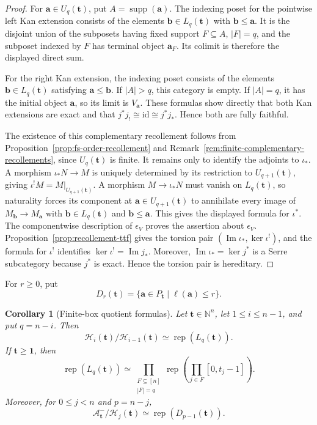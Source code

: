 \documentclass[12pt,reqno]{amsart}
\newtheorem{corollary}[theorem]{Corollary}
\theoremstyle{definition}
\theoremstyle{remark}
\newcommand{\Rep}{\operatorname{rep}}
\begin{document}
\begin{proof}
For $\mathbf a\in U_q(\mathbf t)$, put $A=\operatorname{supp}(\mathbf a)$.  The indexing poset for the pointwise left Kan extension consists of the elements $\mathbf b\in L_q(\mathbf t)$ with $\mathbf b\le\mathbf a$.  It is the disjoint union of the subposets having fixed support $F\subseteq A$, $|F|=q$, and the subposet indexed by $F$ has terminal object $\mathbf a_F$.  Its colimit is therefore the displayed direct sum.

For the right Kan extension, the indexing poset consists of the elements $\mathbf b\in L_q(\mathbf t)$ satisfying $\mathbf a\le\mathbf b$.  If $|A|>q$, this category is empty.  If $|A|=q$, it has the initial object $\mathbf a$, so its limit is $V_{\mathbf a}$.  These formulas show directly that both Kan extensions are exact and that $j^*j_!\cong\mathrm{id}\cong j^*j_*$.  Hence both are fully faithful.

The existence of this complementary recollement follows from
Proposition~\ref{prop:fs-order-recollement} and
Remark~\ref{rem:finite-complementary-recollements}, since
$U_q(\mathbf t)$ is finite.  It remains only to identify the adjoints to
$\iota_*$.  A morphism
$\iota_*N\to M$ is uniquely determined by its restriction to
$U_{q+1}(\mathbf t)$, giving
$\iota^!M=M|_{U_{q+1}(\mathbf t)}$.  A morphism $M\to\iota_*N$ must vanish
on $L_q(\mathbf t)$, so naturality forces its component at
$\mathbf a\in U_{q+1}(\mathbf t)$ to annihilate every image of
$M_{\mathbf b}\to M_{\mathbf a}$ with $\mathbf b\in L_q(\mathbf t)$ and
$\mathbf b\le\mathbf a$.  This gives the displayed formula for $\iota^*$.
The componentwise description of $\epsilon_V$ proves the assertion about
$\epsilon_V$.  Proposition~\ref{prop:recollement-ttf} gives the torsion pair
$(\operatorname{Im}\iota_*,\ker\iota^!)$, and the formula for $\iota^!$
identifies $\ker\iota^!=\operatorname{Im}j_*$.  Moreover,
$\operatorname{Im}\iota_*=\ker j^*$ is a Serre subcategory because $j^*$ is
exact.  Hence the torsion pair is hereditary.
\end{proof}


For $r\ge0$, put
\[
D_r(\mathbf t)=\{\mathbf a\in P_{\mathbf t}\mid\ell(\mathbf a)\le r\}.
\]

\begin{corollary}[Finite-box quotient formulas]
\label{cor:finite-quotient-formulas}
Let $\mathbf t\in\mathbb N^n$, let $1\le i\le n-1$, and put $q=n-i$.
Then
\[
\mathcal H_i(\mathbf t)/\mathcal H_{i-1}(\mathbf t)
\simeq\Rep(L_q(\mathbf t)).
\]
If $\mathbf t\ge\mathbf1$, then
\[
\Rep(L_q(\mathbf t))
\simeq
\prod_{\substack{F\subseteq[n]\\|F|=q}}
\Rep\left(\prod_{j\in F}[0,t_j-1]\right).
\]
Moreover, for $0\le j<n$ and $p=n-j$,
\begin{equation}\label{eq:finite-complementary-quotient}
\mathcal A^-_{\mathbf t}/\mathcal H_j(\mathbf t)
\simeq\Rep(D_{p-1}(\mathbf t)).
\end{equation}
\end{corollary}
\end{document}
